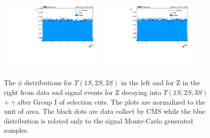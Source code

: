 \begin{figure}[!htbp]
\begin{center}
\includegraphics[width=0.45\textwidth]{figures_and_tables/outputPlots/ZtoUpsilon_Cat0_ZZZZZ/au/data_x_mc/noKinCuts/h_noKin_Upsilon_phi}\hspace*{1.cm}
\includegraphics[width=0.45\textwidth]{figures_and_tables/outputPlots/ZtoUpsilon_Cat0_ZZZZZ/au/data_x_mc/noKinCuts/h_noKin_Z_phi}
\end{center}\vspace*{-.5cm}
\caption{The $\phi$ distributions for $\Upsilon(1S,2S,3S)$ in the left and for Z in the right from data and signal events for Z decaying into $\Upsilon(1S,2S,3S)$ + $\gamma$ after Group I of selection cuts. The plots are normalized to the unit of area. The black dots are data collect by CMS while the blue distribution is related only to the signal Monte-Carlo generated samples.}
\label{fig:phiUpsilon_and_Z_ZtoUpsilon_Cat0}
\end{figure}


